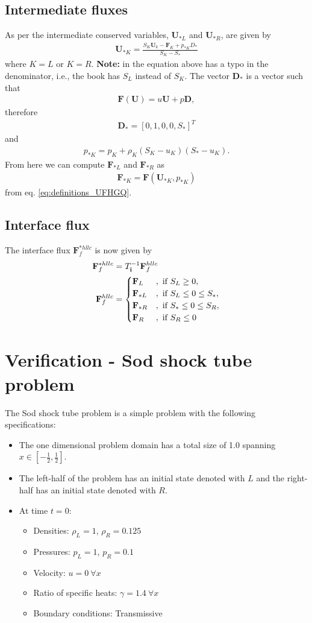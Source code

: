 \documentclass[10pt,letterpaper,notitlepage]{article}
\numberwithin{equation}{section}
\newcommand{\uvec}[1]{\boldsymbol{\hat{\textbf{#1}}}}
\newcommand{\ihat}{\uvec{\i}}
\newcommand{\beqn}{\begin{equation}\begin{aligned}}
\newcommand{\eeqn}{\end{aligned}\end{equation}}
\begin{document}
\subsection{Intermediate fluxes}
As per \cite{Toro} the intermediate conserved variables, $\mathbf{U}_{*L}$ and $\mathbf{U}_{*R}$, are given by
\beqn 
\mathbf{U}_{*K} =
\frac{S_K \mathbf{U}_k - \mathbf{F}_K + p_{*K} D_{*}} 
{S_K - S_{*}}
\eeqn 
where $K=L$ or $K=R$. \textbf{Note: }in \cite{Toro} the equation above has a typo in the denominator, i.e., the book has $S_L$ instead of $S_K$. The vector $\mathbf{D}_*$ is a vector such that
\beqn 
\mathbf{F}(\mathbf{U}) = u \mathbf{U} + p\mathbf{D},
\eeqn 
therefore 
\beqn 
\mathbf{D}_* = [0,1,0,0,S_*]^T
\eeqn 
and 
\beqn 
p_{*K} = p_K + \rho_K (S_K-u_K)(S_{*}-u_K).
\eeqn 
\newline
\newline
From here we can compute $\mathbf{F}_{*L}$ and $\mathbf{F}_{*R}$ as
\beqn 
\mathbf{F}_{*K} = \mathbf{F}(\mathbf{U}_{*K},p_{*K})
\eeqn 
from eq. \eqref{eq:definitions_UFHGQ}.

\subsection{Interface flux}
The interface flux $\mathbf{F}_f^{*hllc}$ is now given by
\beqn 
\mathbf{F}_f^{*hllc} &= 
T_{\ihat}^{-1} \mathbf{F}_f^{hllc}  \\
\mathbf{F}_f^{hllc} &= 
\begin{cases}
\mathbf{F}_L &,\text{ if } S_L \ge 0, \\
\mathbf{F}_{*L} &,\text{ if } S_L \le 0 \le S_*, \\
\mathbf{F}_{*R} &,\text{ if } S_* \le 0 \le S_R, \\
\mathbf{F}_R &,\text{ if } S_R \le 0
\end{cases}
\eeqn 

\vspace{1cm}
\section{Verification - Sod shock tube problem}
The Sod shock tube problem is a simple problem with the following specifications:
\begin{itemize}
	\item The one dimensional problem domain has a total size of 1.0 spanning $x\in[-\frac{1}{2},\frac{1}{2}]$.
	\item The left-half of the problem has an initial state denoted with $L$ and the right-half has an initial state denoted with $R$.
	\item At time $t=0$:
	\begin{itemize}
		\item Densities: $\rho_L = 1$, $\rho_R = 0.125$
		\item Pressures: $p_L=1$, $p_R=0.1$
		\item Velocity: $u=0 \ \forall x$  
		\item Ratio of specific heats: $\gamma=1.4 \ \forall x$
		\item Boundary conditions: Transmissive
	\end{itemize} 
\end{itemize}
\end{document}
